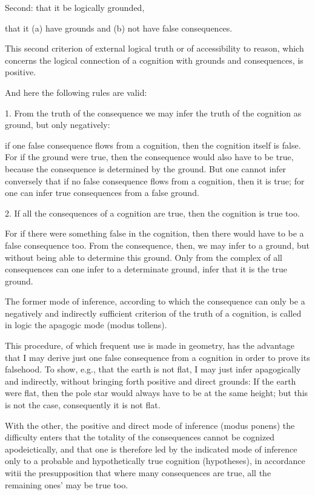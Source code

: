 Second: that it be logically grounded,

that it (a) have grounds and (b) not have false consequences.

    This second criterion of external logical truth or
    of accessibility to reason, which concerns the logical connection of
    a cognition with grounds and consequences, is positive.

And here the following rules are valid:

1. From the truth of the consequence we may infer
the truth of the cognition as ground, but only negatively:

    if one false consequence flows from a cognition,
    then the cognition itself is false.
    For if the ground were true,
    then the consequence would also have to be true,
    because the consequence is determined by the ground.
    But one cannot infer conversely that
    if no false consequence flows from a cognition, then it is true;
    for one can infer true consequences from a false ground.

2. If all the consequences of a cognition are true,
then the cognition is true too.

    For if there were something false in the cognition,
    then there would have to be a false consequence too.
    From the consequence, then, we may infer to a ground,
    but without being able to determine this ground.
    Only from the complex of all consequences can one
    infer to a determinate ground,
    infer that it is the true ground.

The former mode of inference, according to which the consequence
can only be a negatively and indirectly sufficient criterion of the truth of a
cognition, is called in logic the apagogic mode (modus tollens).

    This procedure, of which frequent use is made in geometry,
    has the advantage that I may derive just one false consequence
    from a cognition in order to prove its falsehood.
    To show, e.g., that the earth is not flat, I may
    just infer apagogically and indirectly,
    without bringing forth positive and direct grounds:
    If the earth were flat, then the pole star would
    always have to be at the same height;
    but this is not the case, consequently it is not flat.

With the other, the positive and direct mode of inference (modus ponens)
the difficulty enters that the totality of the consequences cannot be
cognized apodeictically, and that one is therefore led by the indicated
mode of inference only to a probable and hypothetically true cognition
(hypotheses), in accordance witii the presupposition that where many
consequences are true, all the remaining ones' may be true too.

